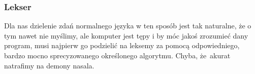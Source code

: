 \documentclass[10pt,t]{beamer}
\begin{document}














\begin{frame}
  \frametitle{Lekser}


  Dla nas dzielenie zdań normalnego języka w ten sposób jest tak naturalne,
  że o tym nawet nie myślimy, ale komputer jest tępy i by móc jakoś
  zrozumieć dany program, musi najpierw go podzielić na leksemy za pomocą
  odpowiedniego, bardzo mocno sprecyzowanego określonego algorytmu.
  Chyba, że~akurat natrafimy na
  {demony nasala}.

\end{frame}
\end{document}
